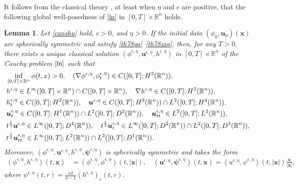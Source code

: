 \documentclass[11pt,reqno]{amsart}
\newtheorem{lem}{Lemma}[section]
\numberwithin{rk}{section}
\numberwithin{prop}{section}
\numberwithin{mydef}{section}
\numberwithin{lem}{section}
\numberwithin{equation}{section}
\numberwithin{thm}{section}
\begin{document}
It follows from the classical theory \cite{evans, oar,amj}, at least when $\eta$
and $\epsilon$ are positive, that the following global well-posedness of \eqref{ln} in $[0,T]\times \mathbb{R}^n$ holds.
\begin{lem}\label{ls}
Let \eqref{canshu} hold, $\epsilon>0$, and $\eta>0$. 
If  the initial data  $(\phi_0, \boldsymbol{u}_0)(\boldsymbol{x})$ are spherically symmetric and satisfy \eqref{th78qq}{\rm--}\eqref{th78zxq}, then, for any  $T>0$,  there exists a unique classical solution $(\phi^{\epsilon,\eta},\boldsymbol{u}^{\epsilon,\eta},h^{\epsilon,\eta})$ in $[0,T]\times \mathbb{R}^n$ of the Cauchy problem $\eqref{ln}$ such that
\begin{align}
&\inf_{[0,T]\times \mathbb{R}^n}\phi(t,x)>0,\quad (\nabla \phi^{\epsilon,\eta},\phi^{\epsilon,\eta}_t)\in C([0,T];H^2(\mathbb{R}^n)), \notag\\
&h^{\epsilon,\eta}\in L^\infty([0,T]\times \mathbb{R}^n)\cap C([0,T]\times \mathbb{R}^n),\quad \nabla h^{\epsilon,\eta}\in C([0,T];H^2(\mathbb{R}^n)),\notag\\
&h^{\epsilon,\eta}_t\in C([0,T];H^2(\mathbb{R}^n)),\quad \boldsymbol{u}^{\epsilon,\eta}\in C([0,T];H^3(\mathbb{R}^n))\cap L^2([0,T];H^4(\mathbb{R}^n)),\label{linearregularity}\\
& \boldsymbol{u}^{\epsilon,\eta}_t\in C([0,T];H^1(\mathbb{R}^n))\cap L^2([0,T];D^2(\mathbb{R}^n)),\quad \boldsymbol{u}^{\epsilon,\eta}_{tt}\in L^2([0,T];L^2(\mathbb{R}^n)),\notag\\
&t^{\frac{1}{2}}\boldsymbol{u}^{\epsilon,\eta}\in L^\infty([0,T];D^4(\mathbb{R}^n)), \quad t^{\frac{1}{2}}\boldsymbol{u}^{\epsilon,\eta}_t\in L^\infty([0,T];D^2(\mathbb{R}^n))\cap L^2([0,T];D^3(\mathbb{R}^n)),\notag\\
& t^{\frac{1}{2}}\boldsymbol{u}^{\epsilon,\eta}_{tt}\in L^\infty([0,T];L^2(\mathbb{R}^n))\cap L^2([0,T];D^1(\mathbb{R}^n)).\notag
\end{align}
Moreover, $(\phi^{\epsilon,\eta},\boldsymbol{u}^{\epsilon,\eta},h^{\epsilon,\eta},\boldsymbol{\psi}^{\epsilon,\eta})$ is  spherically symmetric and takes the form
\begin{equation}\label{2..}
\begin{aligned}
(\phi^{\epsilon,\eta},h^{\epsilon,\eta})(t, \boldsymbol{x})&=(\phi^{\epsilon,\eta},\phi^{\epsilon,\eta})(t,|\boldsymbol{x}|),\quad 
(\boldsymbol{u}^{\epsilon,\eta},\boldsymbol{\psi}^{\epsilon,\eta})(t, \boldsymbol{x})=(u^{\epsilon,\eta}, \psi^{\epsilon,\eta})(t,|\boldsymbol{x}|) \frac{\boldsymbol{x}}{|\boldsymbol{x}|},
\end{aligned}
\end{equation} 
where  $\psi^{\epsilon,\eta}(t,r)=\frac{a\delta}{\delta-1}(h^{\epsilon,\eta})_r(t,r)$.
\end{lem}
\end{document}
